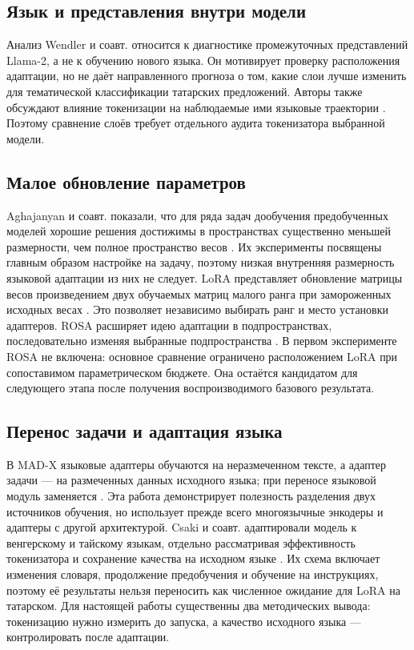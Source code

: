 \documentclass{misisarticle}
\begin{document}
\subsection{Язык и представления внутри модели}

Анализ Wendler и соавт. \cite{wendler2024llamas} относится к диагностике промежуточных представлений Llama-2, а не к обучению нового языка. Он мотивирует проверку расположения адаптации, но не даёт направленного прогноза о том, какие слои лучше изменить для тематической классификации татарских предложений. Авторы также обсуждают влияние токенизации на наблюдаемые ими языковые траектории \cite{wendler2024llamas}. Поэтому сравнение слоёв требует отдельного аудита токенизатора выбранной модели.

\subsection{Малое обновление параметров}

Aghajanyan и соавт. показали, что для ряда задач дообучения предобученных моделей хорошие решения достижимы в пространствах существенно меньшей размерности, чем полное пространство весов \cite{aghajanyan2020intrinsic}. Их эксперименты посвящены главным образом настройке на задачу, поэтому низкая внутренняя размерность языковой адаптации из них не следует. LoRA представляет обновление матрицы весов произведением двух обучаемых матриц малого ранга при замороженных исходных весах \cite{hu2021lora}. Это позволяет независимо выбирать ранг и место установки адаптеров. ROSA расширяет идею адаптации в подпространствах, последовательно изменяя выбранные подпространства \cite{hameed2024rosa}. В первом эксперименте ROSA не включена: основное сравнение ограничено расположением LoRA при сопоставимом параметрическом бюджете. Она остаётся кандидатом для следующего этапа после получения воспроизводимого базового результата.

\subsection{Перенос задачи и адаптация языка}

В MAD-X языковые адаптеры обучаются на неразмеченном тексте, а адаптер задачи — на размеченных данных исходного языка; при переносе языковой модуль заменяется \cite{pfeiffer2020mad}. Эта работа демонстрирует полезность разделения двух источников обучения, но использует прежде всего многоязычные энкодеры и адаптеры с другой архитектурой. Csaki и соавт. адаптировали модель к венгерскому и тайскому языкам, отдельно рассматривая эффективность токенизатора и сохранение качества на исходном языке \cite{csaki2023efficiently}. Их схема включает изменения словаря, продолжение предобучения и обучение на инструкциях, поэтому её результаты нельзя переносить как численное ожидание для LoRA на татарском. Для настоящей работы существенны два методических вывода: токенизацию нужно измерить до запуска, а качество исходного языка — контролировать после адаптации.
\end{document}
